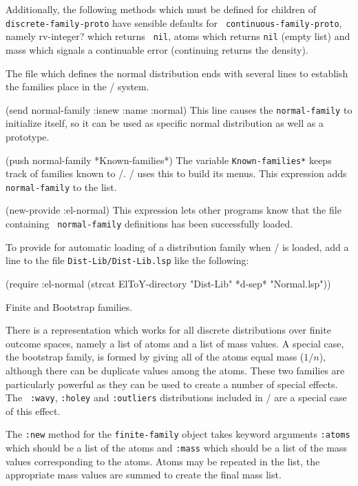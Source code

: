Additionally, the following methods which must be defined for children
of {\tt discrete-family-proto\/} have sensible defaults for {\tt
continuous-family-proto\/}, namely \:rv-integer? which returns {\tt
nil}, \:atoms which returns {\tt nil} (empty list) and \:mass which
signals a continuable error (continuing returns the density).

\medskip

The file which defines the normal distribution ends with
several lines to establish the families place in the \eltoy/ system.

\begincode
(send normal-family :isnew :name :normal)
\endcode
This line causes the {\tt normal-family\/} to initialize itself, so it
can be used as specific normal distribution as well as a prototype.

\begincode
(push normal-family *Known-families*)
\endcode
The variable {\tt *Known-families*\/} keeps track of families known to
\eltoy/.  \eltoy/ uses this to build its menus.  This expression adds
{\tt normal-family\/} to the list.

\begincode
(new-provide :el-normal)
\endcode
This expression lets other programs know that the file containing {\tt
normal-family\/} definitions has been successfully loaded.

To provide for automatic loading of a distribution family when \eltoy/
is loaded, add a line to the file {\tt Dist-Lib/Dist-Lib.lsp\/} like
the following:

\begincode
(require :el-normal (strcat ElToY-directory "Dist-Lib" *d-sep*  "Normal.lsp"))
\endcode

 Finite and Bootstrap families.

There is a representation which works for  all discrete distributions
over finite outcome spaces, namely a list of atoms and a list of mass
values.  A special case, the bootstrap family, is formed by giving
all of the atoms equal mass ($1/n$), although there can be duplicate
values among the atoms.  These two families are particularly powerful
as they can be used to create a number of special effects.  The {\tt
:wavy\/}, {\tt :holey\/} and {\tt :outliers\/} distributions included
in \clttoy/ are a special case of this effect.

The {\tt :new\/} method for the {\tt finite-family\/} object takes
keyword arguments {\tt :atoms\/} which should be a list of the atoms
and {\tt :mass\/} which should be a list of the mass values
corresponding to the atoms.  Atoms may be repeated in the list, the
appropriate mass values are summed to create the final mass list.


